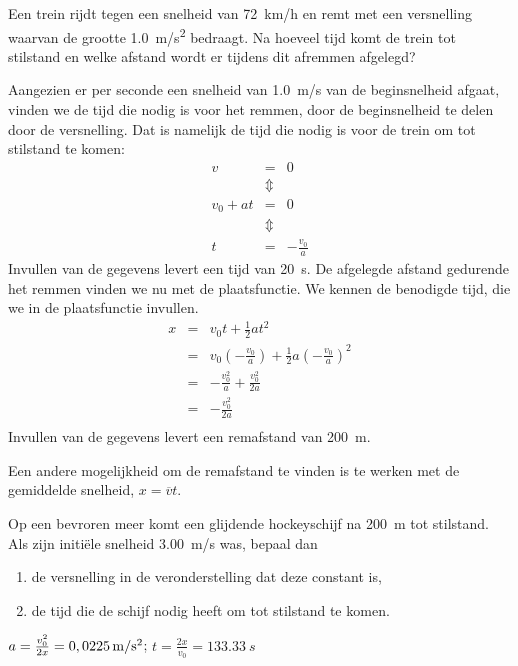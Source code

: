 \documentclass{ximera}
\begin{document}
\begin{exercise}
    Een trein rijdt tegen een snelheid van \SI{72}{km/h} en remt met een versnelling waarvan de grootte \SI{1,0}{m/s^2} bedraagt. Na hoeveel tijd komt de trein tot stilstand en welke afstand wordt er tijdens dit afremmen afgelegd?

    \begin{oplossing}
        Aangezien er per seconde een snelheid van \SI{1,0}{m/s} van de beginsnelheid afgaat, vinden we de tijd die nodig is voor het remmen, door de beginsnelheid te delen door de versnelling. Dat is namelijk de tijd die nodig is voor de trein om tot stilstand te komen:
        \begin{eqnarray*}
            v&=&0\\
            &\Updownarrow&\\
            v_0+at&=&0\\
            &\Updownarrow&\\
            t&=&-\frac{v_0}{a}
        \end{eqnarray*}
        Invullen van de gegevens levert een tijd van \SI{20}{s}. De afgelegde afstand gedurende het remmen vinden we nu met de plaatsfunctie. We kennen de benodigde tijd, die we in de plaatsfunctie invullen.
        \begin{eqnarray*}
            x&=&v_0t+\frac{1}{2}at^2\\
            &=&v_0\left(-\frac{v_0}{a}\right)+\frac{1}{2}a\left(-\frac{v_0}{a}\right)^2\\
            &=&-\frac{v_0^2}{a}+\frac{v_0^2}{2a}\\
            &=&-\frac{v_0^2}{2a}\\
        \end{eqnarray*}
        Invullen van de gegevens levert een remafstand van \SI{200}{m}. 

        Een andere mogelijkheid om de remafstand te vinden is te werken met de gemiddelde snelheid, $x=\overline{v}t$.
    \end{oplossing}
\end{exercise}

\begin{exercise}
    Op een bevroren meer komt een glijdende hockeyschijf na \SI{200}{m} tot stilstand. Als zijn initi\"ele snelheid \SI{3,00}{m/s} was, bepaal dan
    \begin{enumerate}
        \item de versnelling in de veronderstelling dat deze constant is,
        \item de tijd die de schijf nodig heeft om tot stilstand te komen.
    \end{enumerate}
    \begin{oplossing}
        $a=\frac{v_0^2}{2x}=0,0225\rm\,m/s^2$; $t=\frac{2x}{v_0}=\SI{133,33}{s}$
    \end{oplossing}
\end{exercise}
\end{document}
